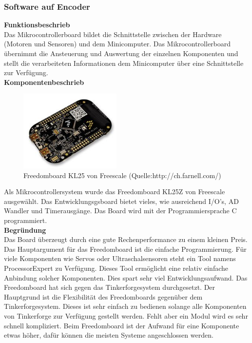 \subsubsection{Software auf Encoder}
\textbf{Funktionsbeschrieb}\\[0.2cm]
Das Mikrocontrollerboard bildet die Schnittstelle zwischen der Hardware (Motoren und Sensoren) und dem Minicomputer. Das Mikrocontrollerboard übernimmt die Ansteuerung und Auswertung der einzelnen Komponenten und stellt die verarbeiteten Informationen dem Minicomputer über eine Schnittstelle zur Verfügung.\\[0.2cm]
\newpage
\textbf{Komponentenbeschrieb}
\begin{figure}[H]
	\centering
	\includegraphics[width=0.45\textwidth]{03_Loesungskonzept/pictures/freedomboard.png}
	\caption{Freedomboard KL25 von Freescale (Quelle:http://ch.farnell.com/)}
\end{figure}
Als Mikrocontrollersystem wurde das Freedomboard KL25Z von Freescale ausgewählt. Das Entwicklungsgsboard bietet vieles, wie ausreichend I/O's, AD Wandler und Timerausgänge. Das Board wird mit der Programmiersprache C programmiert.\\[0.2cm]
\textbf{Begründung}\\[0.2cm]
Das Board überzeugt durch eine gute Rechenperformance zu einem kleinen Preis. Das Hauptargument für das Freedomboard ist die einfache Programmierung. Für viele Komponenten wie Servos oder Ultraschalsensoren steht ein Tool namens ProcessorExpert zu Verfügung. Dieses Tool ermöglicht eine relativ einfache Anbindung solcher Komponenten. Dies spart sehr viel Entwicklungsaufwand.
Das Freedomboard hat sich gegen das Tinkerforgesystem durchgesetzt. Der Hauptgrund ist die Flexibilität des Freedomboards gegenüber dem Tinkerforgesystem. Dieses ist sehr einfach zu bedienen solange alle Komponenten von Tinkerforge zur Verfügung gestellt werden. Fehlt aber ein Modul wird es sehr schnell kompliziert. Beim Freedomboard ist der Aufwand für eine Komponente etwas höher, dafür können die meisten Systeme angeschlossen werden.\\[0.2cm]
